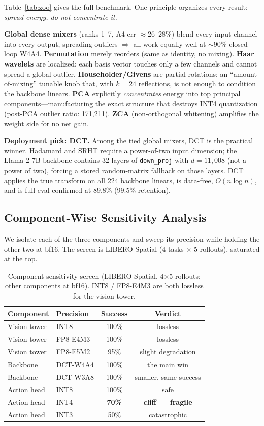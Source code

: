 \documentclass[conference]{IEEEtran}
\begin{document}
Table~\ref{tab:zoo} gives the full benchmark. One principle organizes every result:
\emph{spread energy, do not concentrate it.}

\textbf{Global dense mixers} (ranks 1--7, A4 err $\approx$26--28\%) blend every input
channel into every output, spreading outliers $\Rightarrow$ all work equally well at
$\sim$90\% closed-loop W4A4. \textbf{Permutation} merely reorders (same as identity,
no mixing). \textbf{Haar wavelets} are localized: each basis vector touches only a few
channels and cannot spread a global outlier. \textbf{Householder/Givens} are partial
rotations: an ``amount-of-mixing'' tunable knob that, with $k\!=\!24$ reflections, is
not enough to condition the backbone linears. \textbf{PCA} explicitly \emph{concentrates}
energy into top principal components---manufacturing the exact structure that destroys
INT4 quantization (post-PCA outlier ratio: 171,211). \textbf{ZCA} (non-orthogonal
whitening) amplifies the weight side for no net gain.

\textbf{Deployment pick: DCT.} Among the tied global mixers, DCT is the practical winner.
Hadamard and SRHT require a power-of-two input dimension; the Llama-2-7B backbone contains
32 layers of \texttt{down\_proj} with $d=11{,}008$ (not a power of two), forcing a stored
random-matrix fallback on those layers. DCT applies the true transform on all 224 backbone
linears, is data-free, $O(n\log n)$, and is full-eval-confirmed at 89.8\% (99.5\% retention).

\subsection{Component-Wise Sensitivity Analysis}
\label{sec:component}

We isolate each of the three components and sweep its precision while holding the other two
at bf16. The screen is LIBERO-Spatial (4 tasks $\times$ 5 rollouts), saturated at the top.

\begin{table}[h]\centering\small
\caption{Component sensitivity screen (LIBERO-Spatial, 4$\times$5 rollouts; other
components at bf16). INT8 / FP8-E4M3 are both lossless for the vision tower.}
\label{tab:sensitivity}
\begin{tabular}{llcc}
\toprule
Component & Precision & Success & Verdict \\
\midrule
Vision tower & INT8      & 100\% & lossless \\
Vision tower & FP8-E4M3  & 100\% & lossless \\
Vision tower & FP8-E5M2  & 95\%  & slight degradation \\
\midrule
Backbone     & DCT-W4A4  & 100\% & the main win \\
Backbone     & DCT-W3A8  & 100\% & smaller, same success \\
\midrule
Action head  & INT8      & 100\% & safe \\
Action head  & INT4      & \textbf{70\%}  & \textbf{cliff — fragile} \\
Action head  & INT3      & 50\%  & catastrophic \\
\bottomrule
\end{tabular}
\end{table}
\end{document}

